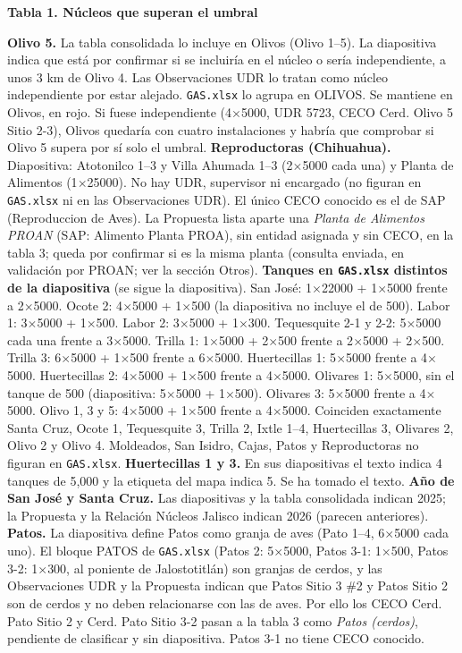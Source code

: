 \documentclass[10pt]{article}
\newcommand{\x}{$\times$}
\begin{document}
\medskip
\textbf{Tabla 1. Núcleos que superan el umbral}
\begin{lnotas}
 \textbf{Olivo 5.} La tabla consolidada lo incluye en Olivos (Olivo 1--5). La diapositiva indica que está por confirmar si se incluiría en el núcleo o sería independiente, a unos 3 km de Olivo 4. Las Observaciones UDR lo tratan como núcleo independiente por estar alejado. \texttt{GAS.xlsx} lo agrupa en OLIVOS. Se mantiene en Olivos, en rojo. Si fuese independiente (4\x5000, UDR 5723, CECO Cerd. Olivo 5 Sitio 2-3), Olivos quedaría con cuatro instalaciones y habría que comprobar si Olivo 5 supera por sí solo el umbral.
 \textbf{Reproductoras (Chihuahua).} Diapositiva: Atotonilco 1--3 y Villa Ahumada 1--3 (2\x5000 cada una) y Planta de Alimentos (1\x25000). No hay UDR, supervisor ni encargado (no figuran en \texttt{GAS.xlsx} ni en las Observaciones UDR). El único CECO conocido es el de SAP (Reproduccion de Aves). La Propuesta lista aparte una \emph{Planta de Alimentos PROAN} (SAP: Alimento Planta PROA), sin entidad asignada y sin CECO, en la tabla 3; queda por confirmar si es la misma planta (consulta enviada, en validación por PROAN; ver la sección Otros).
 \textbf{Tanques en \texttt{GAS.xlsx} distintos de la diapositiva} (se sigue la diapositiva). San José: 1\x22000 + 1\x5000 frente a 2\x5000. Ocote 2: 4\x5000 + 1\x500 (la diapositiva no incluye el de 500). Labor 1: 3\x5000 + 1\x500. Labor 2: 3\x5000 + 1\x300. Tequesquite 2-1 y 2-2: 5\x5000 cada una frente a 3\x5000. Trilla 1: 1\x5000 + 2\x500 frente a 2\x5000 + 2\x500. Trilla 3: 6\x5000 + 1\x500 frente a 6\x5000. Huertecillas 1: 5\x5000 frente a 4\x5000. Huertecillas 2: 4\x5000 + 1\x500 frente a 4\x5000. Olivares 1: 5\x5000, sin el tanque de 500 (diapositiva: 5\x5000 + 1\x500). Olivares 3: 5\x5000 frente a 4\x5000. Olivo 1, 3 y 5: 4\x5000 + 1\x500 frente a 4\x5000. Coinciden exactamente Santa Cruz, Ocote 1, Tequesquite 3, Trilla 2, Ixtle 1--4, Huertecillas 3, Olivares 2, Olivo 2 y Olivo 4. Moldeados, San Isidro, Cajas, Patos y Reproductoras no figuran en \texttt{GAS.xlsx}.
 \textbf{Huertecillas 1 y 3.} En sus diapositivas el texto indica 4 tanques de 5,000 y la etiqueta del mapa indica 5. Se ha tomado el texto.
 \textbf{Año de San José y Santa Cruz.} Las diapositivas y la tabla consolidada indican 2025; la Propuesta y la Relación Núcleos Jalisco indican 2026 (parecen anteriores).
 \textbf{Patos.} La diapositiva define Patos como granja de aves (Pato 1--4, 6\x5000 cada uno). El bloque PATOS de \texttt{GAS.xlsx} (Patos 2: 5\x5000, Patos 3-1: 1\x500, Patos 3-2: 1\x300, al poniente de Jalostotitlán) son granjas de cerdos, y las Observaciones UDR y la Propuesta indican que Patos Sitio 3 \#2 y Patos Sitio 2 son de cerdos y no deben relacionarse con las de aves. Por ello los CECO Cerd. Pato Sitio 2 y Cerd. Pato Sitio 3-2 pasan a la tabla 3 como \emph{Patos (cerdos)}, pendiente de clasificar y sin diapositiva. Patos 3-1 no tiene CECO conocido.

\end{lnotas}
\end{document}
